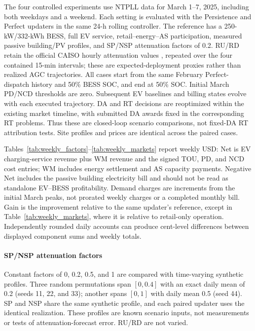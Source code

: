 \documentclass[final,5p,times]{elsarticle}
\begin{document}
The four controlled experiments use NTPLL data for March 1--7, 2025,
including both weekdays and a weekend. Each setting is evaluated with the
Persistence and Perfect updaters in the same 24-h rolling controller. The
reference has a 250-kW/332-kWh BESS, full EV service, retail--energy--AS
participation, measured passive building/PV profiles, and SP/NSP attenuation
factors of 0.2. RU/RD retain the official CAISO hourly attenuation values
\cite{caisoAttenuation2025}, repeated over the four contained 15-min intervals;
these are expected-deployment proxies rather than realized AGC trajectories.
All cases start from the same February Perfect-dispatch history and 50\%
BESS SOC, and end at 50\% SOC. Initial March PD/NCD thresholds are zero.
Subsequent EV baselines and billing states evolve with each executed
trajectory. DA and RT decisions are reoptimized within the existing market
timeline, with submitted DA awards fixed in the corresponding RT problems.
Thus these are closed-loop scenario comparisons, not fixed-DA RT attribution
tests. Site profiles and prices are identical across the paired cases.

Tables~\ref{tab:weekly_factors}--\ref{tab:weekly_markets} report weekly USD:
Net is EV charging-service revenue plus WM revenue and the signed TOU, PD,
and NCD cost entries; WM includes energy settlement and AS capacity payments.
Negative Net includes the passive building electricity bill and should not
be read as standalone EV--BESS profitability. Demand charges are increments
from the initial March peaks, not prorated weekly charges or a completed
monthly bill. Gain is the improvement relative to the same updater's
reference, except in Table~\ref{tab:weekly_markets}, where it is relative to
retail-only operation. Independently rounded daily accounts can produce
cent-level differences between displayed component sums and weekly totals.

\paragraph{SP/NSP attenuation factors}
Constant factors of 0, 0.2, 0.5, and 1 are compared with time-varying synthetic
profiles. Three random permutations span $[0,0.4]$ with an exact daily mean
of 0.2 (seeds 11, 22, and 33); another spans $[0,1]$ with daily mean 0.5
(seed 44). SP and NSP share the same synthetic profile, and each paired
updater uses the identical realization. These profiles are known scenario
inputs, not measurements or tests of attenuation-forecast error. RU/RD are
not varied.
\end{document}
